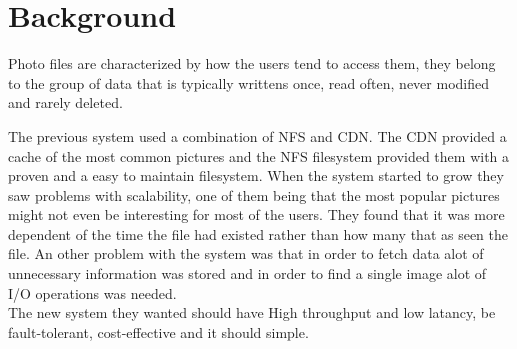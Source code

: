 \section{Background}
Photo files are characterized by how the users tend to access them, they belong 
to the group of data that is typically writtens once, read often, never modified 
and rarely deleted.
 
The previous system used a combination of NFS and CDN. The CDN provided a cache of  
the most common pictures and the NFS filesystem provided them with a proven and
a easy to maintain filesystem. When the system started to grow they saw problems
with scalability, one of them being that the most popular pictures might not even be 
interesting for most of the users. They found that it was more dependent of the time 
the file had existed rather than how many that as seen the file. An other problem with
the system was that in order to fetch data alot of unnecessary information was stored 
and in order to find a single image alot of I/O operations was needed.\\

The new system they wanted should have High throughput and low latancy, be fault-tolerant,
cost-effective and it should simple.




